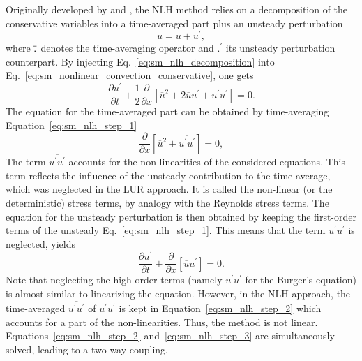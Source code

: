 
Originally developed by \citet{He1998} and \citet{Ning1998},
the NLH method
relies on a decomposition of the conservative variables into a
time-averaged part plus an unsteady perturbation
\begin{equation}
	u = \overline{u} + u^\prime,
	\label{eq:sm_nlh_decomposition}
\end{equation}
where $\overline{\vphantom{u}.}$ denotes the time-averaging operator and
$.^\prime$ its unsteady perturbation counterpart.
By injecting Eq.~\eqref{eq:sm_nlh_decomposition} into
Eq.~\eqref{eq:sm_nonlinear_convection_conservative}, one gets
\begin{equation}
	\frac{\partial u^\prime}{\partial t} + 
	\frac{1}{2}\frac{\partial}{\partial x} \left[
	\overline{u}^2 + 2 \overline{u} u^\prime + u^\prime u^\prime \right] = 
	0.
	\label{eq:sm_nlh_step_1}
\end{equation}
The equation for the time-averaged part can be obtained by time-averaging
Equation~\eqref{eq:sm_nlh_step_1}
\begin{equation}
	\frac{\partial}{\partial x}
	\left[\overline{u}^2 + 
	\overline{u^\prime u^\prime}\right] =
	0,
	\label{eq:sm_nlh_step_2}
\end{equation}
The term $\overline{u^\prime u^\prime}$
accounts for the non-linearities of the considered equations. 
This term reflects the influence of the unsteady contribution to
the time-average, which was neglected in the LUR approach. It
is called the non-linear 
(or the deterministic) stress terms, by analogy with
the Reynolds stress terms. 
The equation for the unsteady perturbation is then obtained by keeping
the first-order terms of the unsteady Eq.~\eqref{eq:sm_nlh_step_1}.
This means that the term $u^\prime u^\prime$ is neglected, yields
\begin{equation}
	\frac{\partial u^\prime}{\partial t} + 
	\frac{\partial}{\partial x} \left[\overline{u} u^\prime \right] = 
	0.
	\label{eq:sm_nlh_step_3}
\end{equation}
Note that neglecting the high-order terms 
(namely $u^\prime u^\prime$ for the Burger's equation) 
is almost similar to
linearizing the equation. However, in the NLH approach,
the time-averaged $\overline{u^\prime u^\prime}$ 
of $u^\prime u^\prime$ is kept in
Equation~\eqref{eq:sm_nlh_step_2} which accounts for a part of the
non-linearities. Thus, the method is not linear. Equations~\eqref{eq:sm_nlh_step_2} 
and~\eqref{eq:sm_nlh_step_3} 
are simultaneously solved, leading to a two-way coupling.

